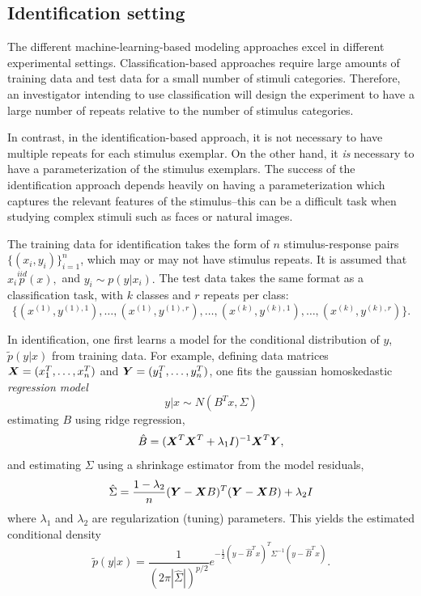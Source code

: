 \documentclass[12pt]{article}
\begin{document}
\subsection{Identification setting}\label{sec:ident}


The different machine-learning-based modeling approaches excel in
different experimental settings.  Classification-based approaches
require large amounts of training data and test data for a small
number of stimuli categories.  Therefore, an investigator intending to
use classification will design the experiment to have a large number
of repeats relative to the number of stimulus categories.

In contrast, in the identification-based approach, it is not necessary
to have multiple repeats for each stimulus exemplar.  On the other
hand, it \emph{is} necessary to have a parameterization of the
stimulus exemplars.  The success of the identification approach
depends heavily on having a parameterization which captures the
relevant features of the stimulus--this can be a difficult task when
studying complex stimuli such as faces or natural images.

The training data for identification takes the form of $n$ stimulus-response pairs
$\{(x_i, y_i)\}_{i=1}^n$, which may or may not have stimulus repeats.
It is assumed that $x_i \stackrel{iid} p(x),$ and $y_i \sim p(y|x_i).$
The test data takes the same format as a classification task, with $k$ classes and $r$ repeats per class:
\[
\{(x^{(1)}, y^{(1), 1}),\hdots, (x^{(1)},y^{(1),r}), \hdots, (x^{(k)}, y^{(k), 1}),\hdots, (x^{(k)},y^{(k),r})\}.
\]

In identification, one first learns a model for the conditional
distribution of $y$, $\tilde{p}(y|x)$ from training data.  For
example, defining data matrices $\boldsymbol{X} = (x_1^T, \hdots, x_n^T)$ and
$\boldsymbol{Y} = (y_1^T,\hdots, y_n^T)$, one fits the gaussian homoskedastic \emph{regression model}
\[
y|x \sim N(B^T x, \Sigma)
\]
estimating $B$ using ridge regression,
\[
\hat{B} = (\boldsymbol{X}^T \boldsymbol{X}^T + \lambda_1 I)^{-1} \boldsymbol{X}^T \boldsymbol{Y},
\]
and estimating $\Sigma$ using a shrinkage estimator from the model residuals,
\[
\hat{\Sigma} = \frac{1-\lambda_2}{n}(\boldsymbol{Y} - \boldsymbol{X} B)^T(\boldsymbol{Y} - \boldsymbol{X} B) + \lambda_2 I
\]
where $\lambda_1$ and $\lambda_2$ are regularization (tuning)
parameters.
This yields the estimated conditional density
\[
\tilde{p}(y|x) = \frac{1}{(2\pi |\hat{\Sigma}|)^{p/2}} e^{-\frac{1}{2} (y-\hat{B}^T x)^T\Sigma^{-1} (y-\hat{B}^T x)}.
\]
\end{document}
